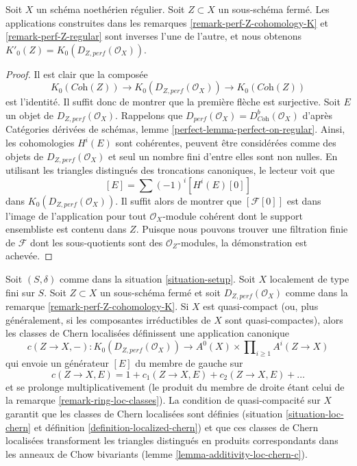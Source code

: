 \begin{lemma}
\label{lemma-perf-Z-regular}
Soit $X$ un schéma noethérien régulier.
Soit $Z \subset X$ un sous-schéma fermé. Les applications construites
dans les remarques \ref{remark-perf-Z-cohomology-K} et
\ref{remark-perf-Z-regular} sont inverses l'une de l'autre, et nous obtenons
$K'_0(Z) = K_0(D_{Z, perf}(\mathcal{O}_X))$.
\end{lemma}

\begin{proof}
Il est clair que la composée
$$
K_0(\textit{Coh}(Z)) \longrightarrow
K_0(D_{Z, perf}(\mathcal{O}_X)) \longrightarrow
K_0(\textit{Coh}(Z))
$$
est l'identité. Il suffit donc de montrer que la première flèche est
surjective. Soit $E$ un objet de $D_{Z, perf}(\mathcal{O}_X)$.
Rappelons que $D_{perf}(\mathcal{O}_X) = D^b_{\textit{Coh}}(\mathcal{O}_X)$
d'après Catégories dérivées de schémas, lemme
\ref{perfect-lemma-perfect-on-regular}.
Ainsi, les cohomologies $H^i(E)$ sont cohérentes, peuvent être considérées
comme des objets de $D_{Z, perf}(\mathcal{O}_X)$ et seul un nombre fini
d'entre elles sont non nulles. En utilisant les triangles distingués des troncations canoniques, le
lecteur voit que
$$
[E] = \sum (-1)^i[H^i(E)[0]]
$$
dans $K_0(D_{Z, perf}(\mathcal{O}_X))$. Il suffit alors de
montrer que $[\mathcal{F}[0]]$ est dans l'image de l'application
pour tout $\mathcal{O}_X$-module cohérent dont le support ensembliste
est contenu dans $Z$. Puisque nous pouvons trouver une filtration finie de
$\mathcal{F}$ dont les sous-quotients sont des $\mathcal{O}_Z$-modules,
la démonstration est achevée.
\end{proof}

\begin{remark}
\label{remark-localized-chern-classes-K}
Soit $(S, \delta)$ comme dans la situation \ref{situation-setup}.
Soit $X$ localement de type fini sur $S$.
Soit $Z \subset X$ un sous-schéma fermé et soit
$D_{Z, perf}(\mathcal{O}_X)$ comme dans la
remarque \ref{remark-perf-Z-cohomology-K}.
Si $X$ est quasi-compact (ou, plus généralement, si les composantes
irréductibles de $X$ sont quasi-compactes), alors
les classes de Chern localisées définissent une application canonique
$$
c(Z \to X, -) : K_0(D_{Z, perf}(\mathcal{O}_X)) \longrightarrow
A^0(X) \times \prod\nolimits_{i \geq 1} A^i(Z \to X)
$$
qui envoie un générateur $[E]$ du membre de gauche sur
$$
c(Z \to X, E) = 1 + c_1(Z \to X, E) + c_2(Z \to X, E) + \ldots
$$
et se prolonge multiplicativement (le produit du membre de
droite étant celui de la remarque \ref{remark-ring-loc-classes}).
La condition de quasi-compacité sur $X$ garantit que les
classes de Chern localisées sont définies (situation \ref{situation-loc-chern} et
définition \ref{definition-localized-chern})
et que ces classes de Chern localisées transforment les triangles distingués en
produits correspondants dans les anneaux de Chow bivariants
(lemme \ref{lemma-additivity-loc-chern-c}).
\end{remark}

